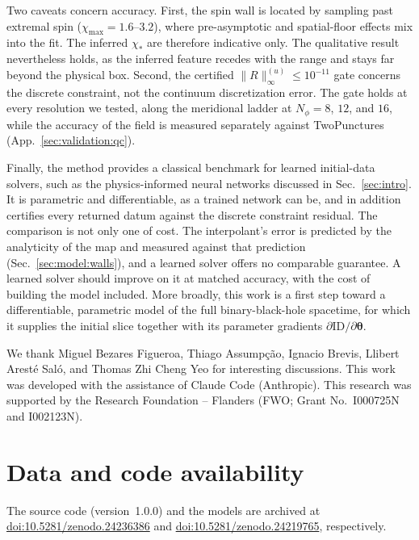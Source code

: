 \documentclass[
  aps,
  prd,
  twocolumn,
  10pt,
  amsmath,
  amssymb,
  nofootinbib,
  superscriptaddress,
  floatfix,
]{revtex4-2}
\newcommand{\vect}[1]{\boldsymbol{#1}}
\newcommand{\dID}{\partial \mathrm{ID}/\partial\vect{\theta}}
\newif\ifshowreferee \showrefereetrue
\newcommand{\refereebegin}{\ifshowreferee\color{refereepurple}\fi}
\newcommand{\refereeend}{\ifshowreferee\color{black}\fi}
\begin{document}
Two caveats concern accuracy.
First, the spin wall is located by sampling past extremal spin ($\chi_{\max}=1.6$--$3.2$), where pre-asymptotic and spatial-floor effects mix into the fit.
The inferred $\chi_\ast$ are therefore indicative only. The qualitative result nevertheless holds, as the inferred feature recedes with the range and stays far beyond the physical box.
Second, the certified $\|R\|^{(u)}_\infty\le10^{-11}$ gate concerns the discrete constraint, not the continuum discretization error.
The gate holds at every resolution we tested, along the meridional ladder at $N_\phi=8$, $12$, and $16$, while the accuracy of the field is measured separately against TwoPunctures (App.~\ref{sec:validation:qc}).

\refereebegin
Finally, the method provides a classical benchmark for learned initial-data solvers, such as the physics-informed neural networks discussed in Sec.~\ref{sec:intro}.
It is parametric and differentiable, as a trained network can be, and in addition certifies every returned datum against the discrete constraint residual.
The comparison is not only one of cost.
The interpolant's error is predicted by the analyticity of the map and measured against that prediction (Sec.~\ref{sec:model:walls}), and a learned solver offers no comparable guarantee.
A learned solver should improve on it at matched accuracy, with the cost of building the model included.
More broadly, this work is a first step toward a differentiable, parametric model of the full binary-black-hole spacetime, for which it supplies the initial slice together with its parameter gradients $\dID$.
\refereeend{}

\begin{acknowledgments}
We thank Miguel Bezares Figueroa, Thiago Assump\c{c}\~ao, Ignacio Brevis, Lli\-bert Arest\'e Sal\'o, and Thomas Zhi Cheng Yeo for interesting discussions.
This work was developed with the assistance of Claude Code (Anthropic).
This research was supported by the Research Foundation -- Flanders (FWO; Grant No.\ I000725N and I002123N).
\end{acknowledgments}

\section*{Data and code availability}
The source code (version~1.0.0) and the models are archived at \href{https://doi.org/10.5281/zenodo.24236386}{doi:10.5281/zenodo.24236386} and \href{https://doi.org/10.5281/zenodo.24219765}{doi:10.5281/zenodo.24219765}, respectively.
\end{document}
